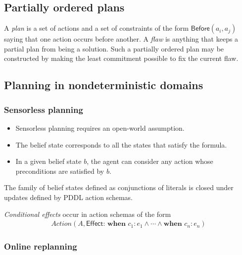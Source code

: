 \documentclass{article}
\begin{document}
\subsection{Partially ordered plans}

\begin{definition}
    A \emph{plan} is a set of actions and a set of constraints of the form $\textsf{Before}(a_i, a_j)$ saying
    that one action occurs before another. A \emph{flaw} is anything that keeps a partial plan from
    being a solution.
    Such a partially ordered plan may be constructed by making the least commitment possible to fix the
    current flaw.
\end{definition}

\subsection{Planning in nondeterministic domains}

\subsubsection{Sensorless planning}

\begin{itemize}
    \item Sensorless planning requires an open-world assumption.
    \item The belief state corresponds to all the states that satisfy the formula.
    \item In a given belief state $b$, the agent can consider any action whose preconditions are satisfied by $b$.
\end{itemize}

\begin{theorem}[R\&N p. 418]
    The family of belief states defined as conjunctions of literals is closed under updates defined by PDDL
    action schemas.
\end{theorem}

\begin{definition}
    \emph{Conditional effects} occur in action schemas of the form
    \begin{align*}
        Action(A,
              \textsf{Effect:}\textbf{ when }c_1: e_1 \wedge \cdots \wedge \textbf{when }c_n: e_n)
    \end{align*}
\end{definition}

\subsubsection{Online replanning}
\end{document}
